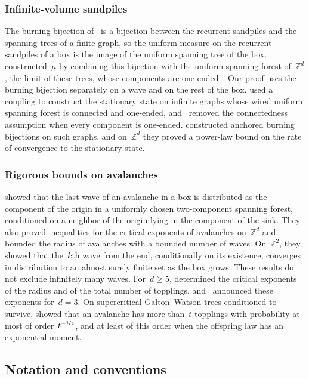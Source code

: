 \documentclass[11pt]{amsart}
\numberwithin{equation}{section}
\newcommand{\Z}{\mathbb Z}
\newcommand{\nf}{\nicefrac}
\begin{document}
\subsubsection{Infinite-volume sandpiles}
The burning bijection of~\citet*{MajumdarDhar1992} is a bijection between the recurrent sandpiles and the spanning trees of a finite graph, so the uniform measure on the recurrent sandpiles of a box is the image of the uniform spanning tree of the box. \citet*{AthreyaJarai2004,AthreyaJarai2006} constructed~$\mu$ by combining this bijection with the uniform spanning forest of~$\Z^d$, the limit of these trees, whose components are one-ended~\citep{Pemantle1991,BLPS2001}. Our proof uses the burning bijection separately on a wave and on the rest of the box. \citet{Jarai2012TransitiveGraphs} used a coupling to construct the stationary state on infinite graphs whose wired uniform spanning forest is connected and one-ended, and~\citet{JaraiWerning2014} removed the connectedness assumption when every component is one-ended. \citet*{GamlinJarai2014} constructed anchored burning bijections on such graphs, and on~$\Z^d$ they proved a power-law bound on the rate of convergence to the stationary state.

\subsubsection{Rigorous bounds on avalanches}
\citet*{BhupatirajuHansonJarai2017} showed that the last wave of an avalanche in a box is distributed as the component of the origin in a uniformly chosen two-component spanning forest, conditioned on a neighbor of the origin lying in the component of the sink. They also proved inequalities for the critical exponents of avalanches on~$\Z^d$ and bounded the radius of avalanches with a bounded number of waves. On~$\Z^2$, they showed that the~$k$th wave from the end, conditionally on its existence, converges in distribution to an almost surely finite set as the box grows. These results do not exclude infinitely many waves. For~$d\geq5$, \citet{Hutchcroft2020} determined the critical exponents of the radius and of the total number of topplings, and~\citet*{LiLiuShiraishi2026} announced these exponents for~$d=3$. On supercritical Galton--Watson trees conditioned to survive, \citet*{JaraiRuszelSaada2020} showed that an avalanche has more than~$t$ topplings with probability at most of order~$t^{-\nf12}$, and at least of this order when the offspring law has an exponential moment.

\subsection{Notation and conventions}
\end{document}
